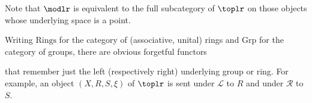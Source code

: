 \documentclass[AHL,Unicode,published]{cedram}
\newcommand{\Rings}{\ensuremath{\mathrm{Rings}}}
\newcommand{\groups}{\ensuremath{\mathrm{Grp}}}
\newcommand{\sR}{\mathscr{R}}
\newcommand{\sL}{\mathscr{L}}
\begin{document}
Note that $\modlr$ is equivalent to the full subcategory of $\toplr$ on those objects whose underlying space is a point.

\begin{notation}\label{not:lr_forgetful}
Writing $\Rings$ for the category of (associative, unital) rings and $\groups$ for the category of groups, there are obvious forgetful functors
\begin{center}
\end{center} that remember just the left (respectively right) underlying group or ring. For example, an object $(X,R,S,\xi)$ of $\toplr$ is sent under $\sL$ to $R$ and under $\sR$ to $S$.
\end{notation}
\end{document}

